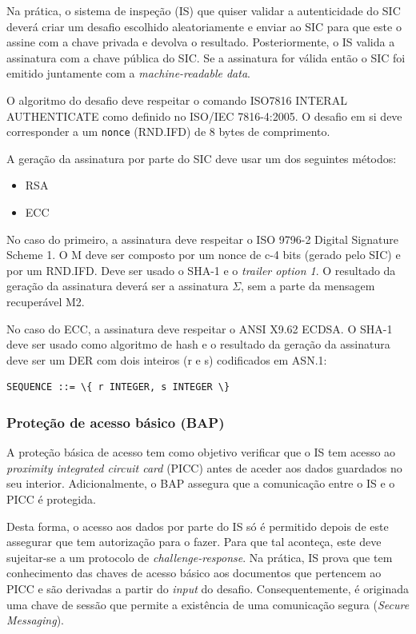Na prática, o sistema de inspeção (IS) que quiser validar a autenticidade do
SIC deverá criar um desafio escolhido aleatoriamente e enviar ao SIC para
que este o assine com a chave privada e devolva o resultado. Posteriormente,
o IS valida a assinatura com a chave pública do SIC. Se a assinatura for
válida então o SIC foi emitido juntamente com a \emph{machine-readable data}.

O algoritmo do desafio deve respeitar o comando ISO7816 INTERAL AUTHENTICATE
como definido no ISO/IEC 7816-4:2005. O desafio em si deve corresponder a um
\texttt{nonce} (RND.IFD) de 8 bytes de comprimento.

A geração da assinatura por parte do SIC deve usar um dos seguintes métodos:
\begin{itemize}
\item RSA
\item ECC
\end{itemize}

No caso do primeiro, a assinatura deve respeitar o ISO 9796-2 Digital
Signature Scheme 1. O M deve ser composto por um nonce de c-4 bits (gerado
pelo SIC) e por um RND.IFD. Deve ser usado o SHA-1 e o
\emph{trailer option 1}. O resultado da geração da assinatura deverá ser a
assinatura \(\Sigma\), sem a parte da mensagem recuperável M2.

No caso do ECC, a assinatura deve respeitar o ANSI X9.62 ECDSA. O SHA-1 deve
ser usado como algoritmo de hash e o resultado da geração da assinatura deve
ser um DER com dois inteiros (r e s) codificados em ASN.1:

\begin{Verbatim}
SEQUENCE ::= \{ r INTEGER, s INTEGER \}
\end{Verbatim}

\subsubsection{Proteção de acesso básico (BAP)}
\label{sec:orgd21bd93}
A proteção básica de acesso tem como objetivo verificar que o IS tem acesso
ao \emph{proximity integrated circuit card} (PICC) antes de aceder aos dados
guardados no seu interior. Adicionalmente, o BAP assegura que a comunicação
entre o IS e o PICC é protegida. 

Desta forma, o acesso aos dados por parte do IS só é permitido depois de
este assegurar que tem autorização para o fazer. Para que tal aconteça, este
deve sujeitar-se a um protocolo de \emph{challenge-response}. Na prática, IS prova
que tem conhecimento das chaves de acesso básico aos documentos que
pertencem ao PICC e são derivadas a partir do \emph{input} do desafio.
Consequentemente, é originada uma chave de sessão que permite a existência
de uma comunicação segura (\emph{Secure Messaging}).

